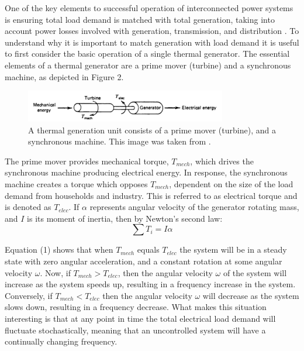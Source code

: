 \documentclass[12pt, a4paper]{article}
\begin{document}
One of the key elements to successful operation of interconnected power systems is ensuring total load demand is matched with total generation, taking into account power losses involved with generation, transmission, and distribution \cite{Wood2013}. To understand why it is important to match generation with load demand it is useful to first consider the basic operation of a single thermal generator. The essential elements of a thermal generator are a prime mover (turbine) and a synchronous machine, as depicted in Figure 2.
\begin{figure}[h]
\centering
\includegraphics[height=1.4cm]{generation}
\caption{A thermal generation unit consists of a prime mover (turbine), and a synchronous machine. This image was taken from \cite{Wood2013}.}
\end{figure}

The prime mover provides mechanical torque, $T_{mech}$, which drives the synchronous machine producing electrical energy. In response, the synchronous machine creates a torque which opposes $T_{mech}$, dependent on the size of the load demand from households and industry. This is referred to as electrical torque and is denoted as $T_{elec}$. If $\alpha$ represents angular velocity of the generator rotating mass, and $I$ is its moment of inertia, then by Newton's second law:
\begin{equation}
\sum T_i = I \alpha 
\end{equation}

Equation (1) shows that when $T_{mech}$ equals $T_{elec}$ the system will be in a steady state with zero angular acceleration, and a constant rotation at some angular velocity $\omega$. Now, if $T_{mech} > T_{elec}$, then the angular velocity $\omega$ of the system will increase as the system speeds up, resulting in a frequency increase in the system. Conversely, if $T_{mech} < T_{elec}$ then the angular velocity $\omega$ will decrease as the system slows down, resulting in a frequency decrease. What makes this situation interesting is that at any point in time the total electrical load demand will fluctuate stochastically, meaning that an uncontrolled system will have a continually changing frequency.\\ 
\end{document}
